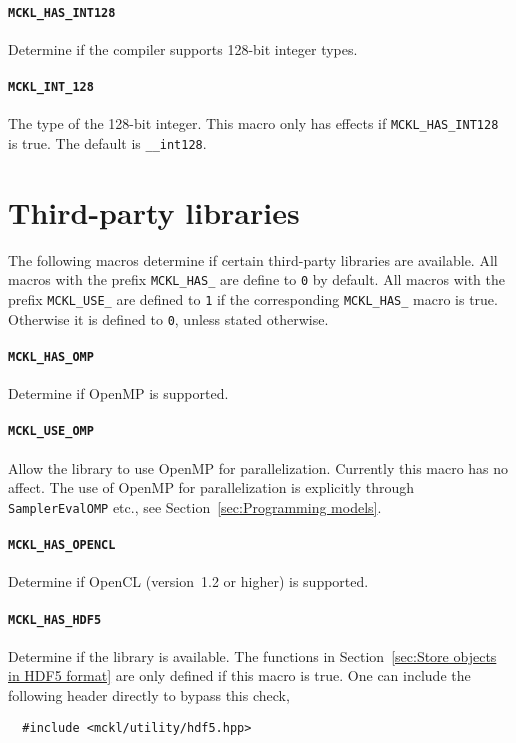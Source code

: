\paragraph{\texttt{MCKL\_HAS\_INT128}} Determine if the compiler supports
128-bit integer types.

\paragraph{\texttt{MCKL\_INT\_128}} The type of the 128-bit integer. This macro
only has effects if \verb|MCKL_HAS_INT128| is true. The default is
\verb|__int128|.

\section{Third-party libraries}
\label{sec:Third-party libraries}

The following macros determine if certain third-party libraries are available.
All macros with the prefix \verb|MCKL_HAS_| are define to \verb|0| by default.
All macros with the prefix \verb|MCKL_USE_| are defined to \verb|1| if the
corresponding \verb|MCKL_HAS_| macro is true. Otherwise it is defined to
\verb|0|, unless stated otherwise.

\paragraph{\texttt{MCKL\_HAS\_OMP}} Determine if OpenMP is supported.

\paragraph{\texttt{MCKL\_USE\_OMP}} Allow the library to use OpenMP for
parallelization. Currently this macro has no affect. The use of OpenMP for
parallelization is explicitly through \verb|SamplerEvalOMP| etc., see
Section~\ref{sec:Programming models}.

\paragraph{\texttt{MCKL\_HAS\_OPENCL}} Determine if OpenCL (version~1.2 or
higher) is supported.

\paragraph{\texttt{MCKL\_HAS\_HDF5}} Determine if the \hdf library is
available. The functions in Section~\ref{sec:Store objects in HDF5 format} are
only defined if this macro is true. One can include the following header
directly to bypass this check,
\begin{Verbatim}
  #include <mckl/utility/hdf5.hpp>
\end{Verbatim}

